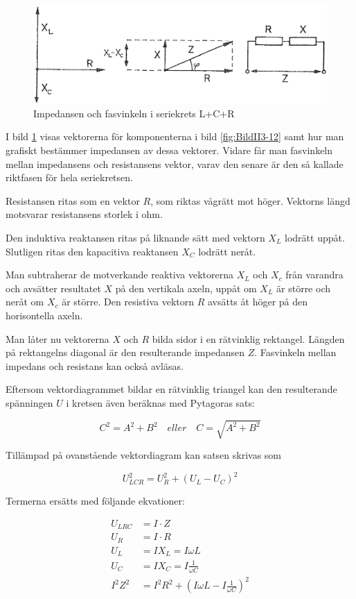 \begin{figure}
\includegraphics[width=\textwidth]{images/cropped_pdfs/bild_2_3-14.pdf}
\caption{Impedansen och fasvinkeln i seriekrets L+C+R}
\label{fig:BildII3-14}
\end{figure}

I bild \ref{fig:BildII3-14} visas vektorerna för komponenterna i bild
\ref{fig:BildII3-12} samt hur man grafiskt bestämmer impedansen av dessa
vektorer.
Vidare får man fasvinkeln mellan impedansens och resistansens vektor, varav den
senare är den så kallade riktfasen för hela seriekretsen.

Resistansen ritas som en vektor \(R\), som riktas vågrätt mot höger.
Vektorns längd motsvarar resistansens storlek i ohm.

Den induktiva reaktansen ritas på liknande sätt med vektorn \(X_L\) lodrätt
uppåt.
Slutligen ritas den kapacitiva reaktansen \(X_C\) lodrätt neråt.

Man subtraherar de motverkande reaktiva vektorerna \(X_L\) och \(X_c\) från
varandra och avsätter resultatet \(X\) på den vertikala axeln, uppåt om \(X_L\)
är större och neråt om \(X_c\) är större.
Den resistiva vektorn \(R\) avsätts åt höger på den horisontella axeln.

Man låter nu vektorerna \(X\) och \(R\) bilda sidor i en rätvinklig rektangel.
Längden på rektangelns diagonal är den resulterande impedansen \(Z\).
Fasvinkeln mellan impedans och resistans kan också avläsas.

Eftersom vektordiagrammet bildar en rätvinklig triangel kan den resulterande
spänningen \(U\) i kretsen även beräknas med Pytagoras sats:

\[C^2 = A^2 + B^2 \quad eller \quad C = \sqrt{A^2 + B^2}\]

Tillämpad på ovanstående vektordiagram kan satsen skrivas som

\[U_{LCR}^2 = U_R^2 + ( U_L - U_C)^2\]

Termerna ersätts med följande ekvationer:

\begin{align*}
  U_{LRC} &= I \cdot Z \\
  U_R &= I \cdot R \\
  U_L &= I X_L = I \omega L \\
  U_C &= I X_C = I \frac{1}{\omega C} \\
  I^2 Z^2 &= I^2 R^2 + ( I \omega L - I\frac{1}{\omega C})^2
\end{align*}

